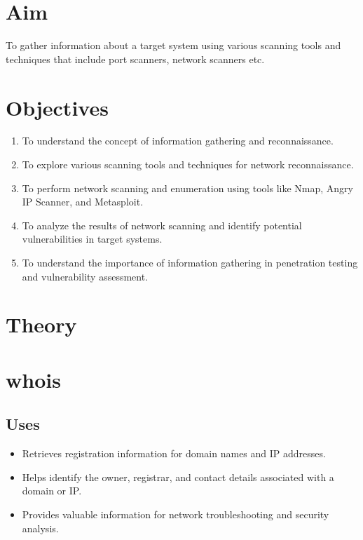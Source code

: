 \documentclass[11pt]{article}
\begin{document}
\tableofcontents
\thispagestyle{empty}
\clearpage

\setcounter{page}{1}

\section{Aim}
To gather information about a target system using various scanning tools and techniques that include port scanners, network scanners etc.
\section{Objectives}
\begin{enumerate}
    \item To understand the concept of information gathering and reconnaissance.
    \item To explore various scanning tools and techniques for network reconnaissance.
    \item To perform network scanning and enumeration using tools like Nmap, Angry IP Scanner, and Metasploit.
    \item To analyze the results of network scanning and identify potential vulnerabilities in target systems.
    \item To understand the importance of information gathering in penetration testing and vulnerability assessment.
\end{enumerate}

\section{Theory}
\section{whois}

\subsection{Uses}
\begin{itemize}
    \item Retrieves registration information for domain names and IP addresses.
    \item Helps identify the owner, registrar, and contact details associated with a domain or IP.
    \item Provides valuable information for network troubleshooting and security analysis.
\end{itemize}
\end{document}
